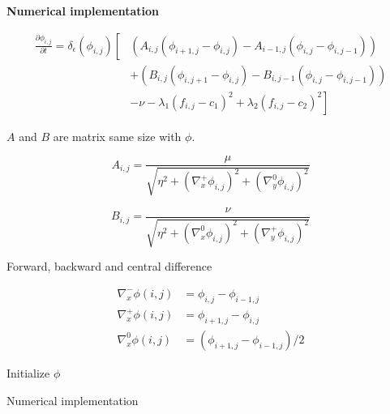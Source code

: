 \textbf{Numerical implementation}

\begin{equation}
    \begin{aligned}
            \frac{\partial \phi_{i, j}}{\partial t} = 
            \delta_{\epsilon}(\phi_{i,j}) \left[ \right.
                    & \left( A_{i,j}(\phi_{i+1, j} - \phi_{i,j})
                            - A_{i-1,j}(\phi_{i, j} - \phi_{i,j-1}) \right) \\
                    & + \left( B_{i, j}(\phi_{i, j+1} - \phi_{i, j}) - 
                             B_{i, j-1}(\phi_{i, j} - \phi_{i, j-1}) \right) \\
                    & - \nu - 
                        \lambda_1(f_{i,j} - c_1)^2 +
                        \lambda_2(f_{i, j} - c_2)^2 
                        \left. \right]
    \end{aligned}
\end{equation}

$A$ and $B$ are matrix same size with $\phi$.

\begin{equation}
    A_{i, j} = \frac{\mu}
                {\sqrt{\eta^2 
                       + (\nabla_x^+ \phi_{i, j} )^2
                       + (\nabla_y^0 \phi_{i, j} )^2 }
                }
\end{equation}

\begin{equation}
    B_{i, j} = \frac{\nu}
                    {\sqrt{\eta^2 
                            + (\nabla_x^0 \phi_{i, j} )^2
                            + (\nabla_y^+ \phi_{i, j} )^2 } 
                    }
\end{equation}

Forward, backward and central difference

\begin{equation}
    \begin{aligned}
        \nabla_x^- \phi(i, j) &= \phi_{i, j} - \phi_{i-1, j} \\
        \nabla_x^+ \phi(i, j) &= \phi_{i+1, j} - \phi_{i, j} \\
        \nabla_x^0 \phi(i, j) &= (\phi_{i+1, j} - \phi_{i-1, j} ) / 2
    \end{aligned}
\end{equation}

\begin{algorithm}[!htb]
    \DontPrintSemicolon
    Initialize $\phi$ \;

    \caption{Numerical implementation}
    \label{alg:chan-vese}
\end{algorithm}

